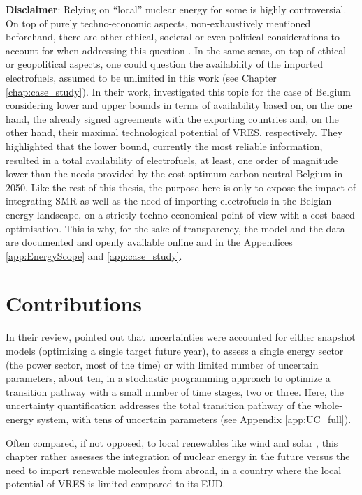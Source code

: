 \textbf{Disclaimer}: Relying on ``local'' nuclear energy for some is highly controversial. On top of purely techno-economic aspects, non-exhaustively mentioned beforehand, there are other ethical, societal or even political considerations to account for when addressing this question \cite{kempf2022}. In the same sense, on top of ethical or geopolitical aspects, one could question the availability of the imported electrofuels, assumed to be unlimited in this work (see Chapter \ref{chap:case_study}). In their work, \citet{lefebvre2022electrofuel} investigated this topic for the case of Belgium considering lower and upper bounds in terms of availability based on, on the one hand, the already signed agreements with the exporting countries and, on the other hand, their maximal technological potential of \gls{VRES}, respectively. They highlighted that the lower bound, \ie currently the most reliable information, resulted in a total availability of electrofuels, at least, one order of magnitude lower than the needs provided by the cost-optimum carbon-neutral Belgium in 2050. Like the rest of this thesis, the purpose here is only to expose the impact of integrating \gls{SMR} as well as the need of importing electrofuels in the Belgian energy landscape, on a strictly techno-economical point of view with a cost-based optimisation. This is why, for the sake of transparency, the model and the data are documented and openly available online \cite{readthedocs_pathway} and in the Appendices \ref{app:EnergyScope} and \ref{app:case_study}.

\section*{Contributions}
\label{sec:atom_mol:contributions}
In their review, \citet{yue2018review} pointed out that uncertainties were accounted for either snapshot models (\ie optimizing a single target future year), to assess a single energy sector (\ie the power sector, most of the time) or with limited number of uncertain parameters, \ie about ten, in a stochastic programming approach to optimize a transition pathway with a small number of time stages, \ie two or three. Here, the uncertainty quantification addresses the total transition pathway of the whole-energy system, with tens of uncertain parameters (see Appendix \ref{app:UC_full}).

Often compared, if not opposed, to local renewables like wind and solar \cite{suna2016nuclear,khatib2016economics}, this chapter rather assesses the integration of nuclear energy in the future versus the need to import renewable molecules from abroad, in a country where the local potential of \gls{VRES} is limited compared to its \gls{EUD}.

